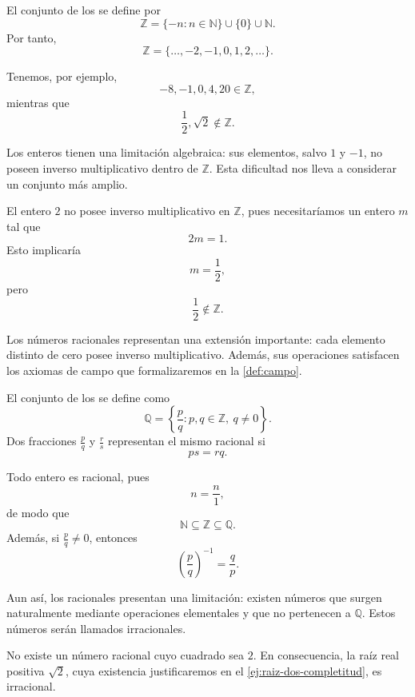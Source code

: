 \begin{samepage}
\begin{definition}
\label{def:enteros}
El conjunto de los  se define por
\[
\mathbb{Z}
=
\{-n:n\in\mathbb{N}\}\cup\{0\}\cup\mathbb{N}.
\]
Por tanto,
\[
\mathbb{Z}=\{\ldots,-2,-1,0,1,2,\ldots\}.
\]
\end{definition}
\end{samepage}

\begin{example}
Tenemos, por ejemplo,
\[
-8,-1,0,4,20\in\mathbb{Z},
\]
mientras que
\[
\frac12,\sqrt2\notin\mathbb{Z}.
\]
\end{example}

Los enteros tienen una limitación algebraica: sus elementos, salvo $1$ y $-1$, no poseen inverso multiplicativo dentro de $\mathbb{Z}$. Esta dificultad nos lleva a considerar un conjunto más amplio.

\begin{example}
El entero $2$ no posee inverso multiplicativo en $\mathbb{Z}$, pues necesitaríamos un entero $m$ tal que
\[
2m=1.
\]
Esto implicaría
\[
m=\frac12,
\]
pero
\[
\frac12\notin\mathbb{Z}.
\]
\end{example}

Los números racionales representan una extensión importante: cada elemento distinto de cero posee inverso multiplicativo. Además, sus operaciones satisfacen los axiomas de campo que formalizaremos en la \cref{def:campo}.

\begin{samepage}
\begin{definition}
\label{def:racionales}
El conjunto de los  se define como
\[
\mathbb{Q}
=
\left\{
\frac{p}{q}:p,q\in\mathbb{Z},\ q\neq0
\right\}.
\]
Dos fracciones $\frac pq$ y $\frac rs$ representan el mismo racional si
\[
ps=rq.
\]
\end{definition}
\end{samepage}

Todo entero es racional, pues
\[
n=\frac n1,
\]
de modo que
\[
\mathbb{N}\subseteq\mathbb{Z}\subseteq\mathbb{Q}.
\]
Además, si $\frac pq\neq0$, entonces
\[
\left(\frac pq\right)^{-1}=\frac qp.
\]

Aun así, los racionales presentan una limitación: existen números que surgen naturalmente mediante operaciones elementales y que no pertenecen a $\mathbb{Q}$. Estos números serán llamados irracionales.

\begin{samepage}
\begin{proposition}
\label{prop:irracionalidad-raiz-dos}
No existe un número racional cuyo cuadrado sea $2$. En consecuencia, la raíz real positiva $\sqrt2$, cuya existencia justificaremos en el \cref{ej:raiz-dos-completitud}, es irracional.
\end{proposition}
\end{samepage}

